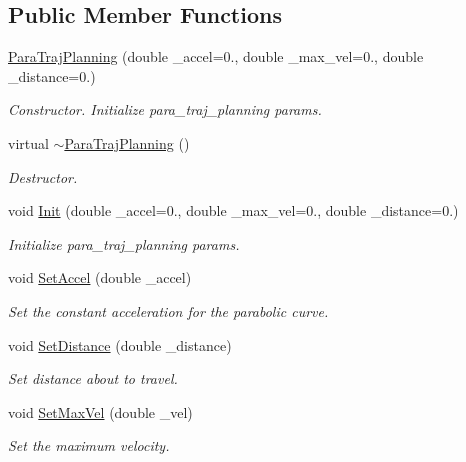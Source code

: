 \subsection*{Public Member Functions}
\begin{DoxyCompactItemize}
\item 
\hyperlink{classnubot_1_1ParaTrajPlanning_a3c1db421a53e6334d1b0e15cfff45178}{Para\-Traj\-Planning} (double \-\_\-accel=0., double \-\_\-max\-\_\-vel=0., double \-\_\-distance=0.)
\begin{DoxyCompactList}\small\item\em Constructor. Initialize para\-\_\-traj\-\_\-planning params. \end{DoxyCompactList}\item 
virtual \hyperlink{classnubot_1_1ParaTrajPlanning_a97765b4d8129ec890a9fb0995a5cb502}{$\sim$\-Para\-Traj\-Planning} ()
\begin{DoxyCompactList}\small\item\em Destructor. \end{DoxyCompactList}\item 
void \hyperlink{classnubot_1_1ParaTrajPlanning_a74f176e639b14c71981c4a722e27bdae}{Init} (double \-\_\-accel=0., double \-\_\-max\-\_\-vel=0., double \-\_\-distance=0.)
\begin{DoxyCompactList}\small\item\em Initialize para\-\_\-traj\-\_\-planning params. \end{DoxyCompactList}\item 
void \hyperlink{classnubot_1_1ParaTrajPlanning_aa9d4233ee5f2fff3a4456b4cf978cdb2}{Set\-Accel} (double \-\_\-accel)
\begin{DoxyCompactList}\small\item\em Set the constant acceleration for the parabolic curve. \end{DoxyCompactList}\item 
void \hyperlink{classnubot_1_1ParaTrajPlanning_a63bc25bfafec6e6f14d32fbbc5bff49b}{Set\-Distance} (double \-\_\-distance)
\begin{DoxyCompactList}\small\item\em Set distance about to travel. \end{DoxyCompactList}\item 
void \hyperlink{classnubot_1_1ParaTrajPlanning_af9a32cc1269869348c8b60d294a19f61}{Set\-Max\-Vel} (double \-\_\-vel)
\begin{DoxyCompactList}\small\item\em Set the maximum velocity. \end{DoxyCompactList}\item 

\end{DoxyCompactItemize}
